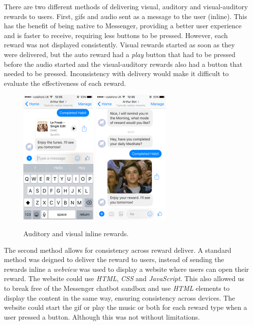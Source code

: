 There are two different methods of delivering visual, auditory and visual-auditory rewards to users. First, gifs and audio sent as a message to the user (inline). This has the benefit of being native to Messenger, providing a better user experience and is faster to receive, requiring less buttons to be pressed. However, each reward was not displayed consistently. Visual rewards started as soon as they were delivered, but the auto reward had a \textit{play} button that had to be pressed before the audio started and the visual-auditory rewards also had a button that needed to be pressed. Inconsistency with delivery would make it difficult to evaluate the effectiveness of each reward.

\begin{figure}[H]
  \centering
  \includegraphics[width=1.5in]{../resources/design/reward-audio-inline.png}
  \hspace{10px}
  \includegraphics[width=1.5in]{../resources/design/reward-visual-inline.png}
  \caption{Auditory and visual inline rewards.}
  \label{fig:rewards_inline}
\end{figure}

The second method allows for consistency across reward deliver. A standard method was deigned to deliver the reward to users, instead of sending the rewards inline a \textit{webview} was used to display a website where users can open their reward. The website could use \textit{HTML}, \textit{CSS} and \textit{JavaScript}. This also allowed us to break free of the Messenger chatbot sandbox and use \textit{HTML} elements to display the content in the same way, ensuring consistency across devices. The website could start the gif or play the music or both for each reward type when a user pressed a button. Although this was not without limitations.


